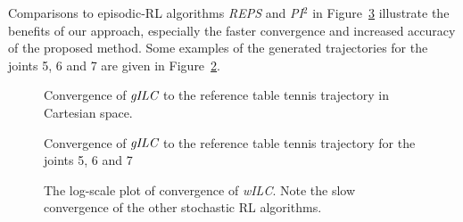Comparisons to episodic-RL algorithms \emph{REPS} and \emph{PI$^{2}$} in Figure~\ref{ttComparison} illustrate the benefits of our approach, especially the faster convergence and increased accuracy of the proposed method. Some examples of the generated trajectories for the joints 5, 6 and 7 are given in Figure~\ref{wILCTrajectoryTT}. 

\begin{figure}
\center
\scalebox{1.0}{}
\caption{Convergence of $\emph{gILC}$ to the reference table tennis trajectory in Cartesian space.}
\label{wILCTrajectoryTTCartesian}
\end{figure}

\begin{figure}
\center
\scalebox{1.0}{}
\caption{Convergence of $\emph{gILC}$ to the reference table tennis trajectory for the joints 5, 6 and 7}
\label{wILCTrajectoryTT}
\end{figure}

\begin{figure}
\begingroup
\scalebox{0.5}{}
\endgroup
\caption{The log-scale plot of convergence of \emph{wILC}. Note the slow convergence of the other stochastic RL algorithms.}
\label{ttComparison}
\end{figure}